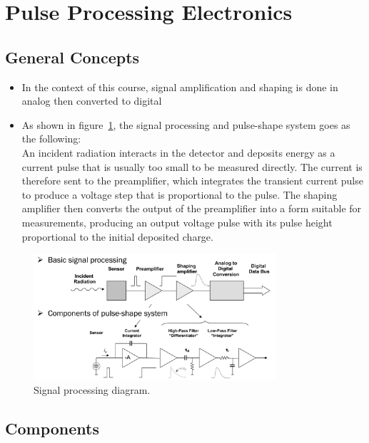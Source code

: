 \section{Pulse Processing Electronics}
\subsection{General Concepts}
\begin{itemize}
    \item In the context of this course, signal amplification and shaping is done in analog then converted to digital  
    \item As shown in figure~\ref{fig:signal_processing}, the signal processing and pulse-shape system goes as the following:\\
    An incident radiation interacts in the detector and deposits energy as a current pulse that is usually too small to be measured directly. The current is therefore sent to the preamplifier, which integrates the transient current pulse to produce a voltage step that is proportional to the pulse. The shaping amplifier then converts the output of the preamplifier into a form suitable for measurements, producing an output voltage pulse with its pulse height proportional to the initial deposited charge. 
\end{itemize}
\begin{figure}[ht]
    \centering
    \includegraphics[width=0.8\textwidth]{images/signal_processing_diagram.png}
    \caption{Signal processing diagram.}
    \label{fig:signal_processing}
\end{figure}
\subsection{Components}

